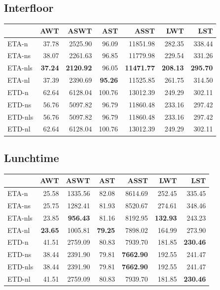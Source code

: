 \documentclass{UoYCSproject}
\begin{document}
\begin{appendices}
\subsection{Interfloor}
\begin{tabular}{l | r r r r r r}
	& AWT & ASWT & AST & ASST & LWT & LST \\
	\hline
    ETA-n & 37.78 & 2525.90 & 96.09 & 11851.98 & 282.35 & 338.44 \\
    ETA-ns & 38.07 & 2261.63 & 96.85 & 11779.98 & 229.54 & 331.26 \\
    ETA-nls & \textbf{37.24} & \textbf{2120.92} & 96.05 & \textbf{11471.77} & \textbf{208.13} & \textbf{295.70} \\
    ETA-nl & 37.39 & 2390.69 & \textbf{95.26} & 11525.85 & 261.75 & 314.50 \\
    ETD-n & 62.64 & 6128.04 & 100.76 & 13012.39 & 249.29 & 302.11 \\
    ETD-ns & 56.76 & 5097.82 & 96.79 & 11860.48 & 233.16 & 297.42 \\
    ETD-nls & 56.76 & 5097.82 & 96.79 & 11860.48 & 233.16 & 297.42 \\
    ETD-nl & 62.64 & 6128.04 & 100.76 & 13012.39 & 249.29 & 302.11
\end{tabular}

\subsection{Lunchtime}
\begin{tabular}{l | r r r r r r}
	& AWT & ASWT & AST & ASST & LWT & LST \\
	\hline
    ETA-n & 25.58 & 1335.56 & 82.08 & 8614.69 & 252.45 & 335.45 \\
    ETA-ns & 25.75 & 1282.41 & 81.93 & 8520.67 & 274.61 & 348.46 \\
    ETA-nls & 23.85 & \textbf{956.43} & 81.16 & 8192.95 & \textbf{132.93} & 243.23 \\
    ETA-nl & \textbf{23.65} & 1005.81 & \textbf{79.25} & 7898.02 & 164.99 & 273.90 \\
    ETD-n & 41.51 & 2759.09 & 80.83 & 7939.70 & 181.85 & \textbf{230.46} \\
    ETD-ns & 38.44 & 2391.90 & 79.81 & \textbf{7662.90} & 192.55 & 241.47 \\
    ETD-nls & 38.44 & 2391.90 & 79.81 & \textbf{7662.90} & 192.55 & 241.47 \\
    ETD-nl & 41.51 & 2759.09 & 80.83 & 7939.70 & 181.85 & \textbf{230.46}
\end{tabular}


\end{appendices}
\end{document}
